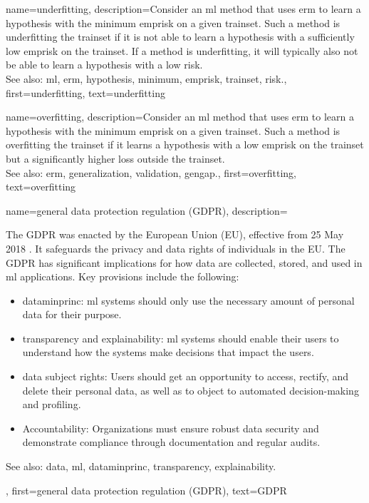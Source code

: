 {name={underfitting},
	description={Consider 
		an \gls{ml} method that uses \gls{erm} to learn a \gls{hypothesis} with the \gls{minimum} \gls{emprisk} 
		on a given \gls{trainset}. Such a method is underfitting the \gls{trainset} if it is 
		not able to learn a \gls{hypothesis} with a sufficiently low \gls{emprisk} on the \gls{trainset}. 
		If a method is underfitting, it will typically also not be able to learn a \gls{hypothesis} with 
		a low \gls{risk}.
					\\ 
		See also: \gls{ml}, \gls{erm}, \gls{hypothesis}, \gls{minimum}, \gls{emprisk}, \gls{trainset}, \gls{risk}.},
	first={underfitting},
	text={underfitting}
}

{name={overfitting},
	description={Consider an 
		\gls{ml} method that uses \gls{erm} to learn a \gls{hypothesis} with the \gls{minimum} \gls{emprisk} on 
		a given \gls{trainset}. Such a method is overfitting the \gls{trainset} if it learns 
		a \gls{hypothesis} with a low \gls{emprisk} on the \gls{trainset} but a significantly higher \gls{loss} outside the \gls{trainset}.
					\\ 
		See also: \gls{erm}, \gls{generalization}, \gls{validation}, \gls{gengap}.},
	first={overfitting},
	text={overfitting}
}

{name={general data protection regulation (GDPR)},
	description={The GDPR
			was enacted by the European Union (EU), effective from 25 May 2018 \cite{GDPR2016}. 
			It safeguards the privacy and \gls{data} rights of individuals in the EU. 
			The GDPR has significant implications for how \gls{data} are collected, stored, and used in \gls{ml}  
			applications. Key provisions include the following:
			\begin{itemize}
				\item \Gls{dataminprinc}: \gls{ml} systems should only use the necessary amount of personal 
				\gls{data} for their purpose.
				\item \Gls{transparency} and \gls{explainability}: \gls{ml} systems should enable their users to 
				understand how the systems make decisions that impact the users.
				\item \Gls{data} subject rights: Users should get an opportunity to access, rectify, and delete their personal \gls{data}, as well as to object to automated decision-making and profiling.
				\item Accountability: Organizations must ensure robust \gls{data} security and demonstrate 
				compliance through documentation and regular audits.
			\end{itemize}
		See also: \gls{data}, \gls{ml}, \gls{dataminprinc}, \gls{transparency}, \gls{explainability}.}, 
	first={general data protection regulation (GDPR)},
	text={GDPR}
}
	
